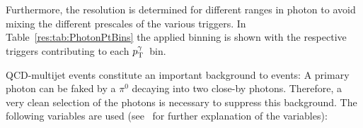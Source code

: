 Furthermore, the resolution is determined for different ranges in photon \pt to avoid mixing the different prescales of the various triggers. 
In Table~\ref{res:tab:PhotonPtBins} the applied binning is shown with the respective triggers contributing to each $p_{\text{T}}^{\gamma}$~bin.
\renewcommand{\arraystretch}{1.5}
\begin{table}[b]
\centering
\caption{Photon \pt~bins and corresponding triggers.}
\label{res:tab:PhotonPtBins}
\end{table}

QCD-multijet events constitute an important background to \GAMJET events: A primary photon can be faked by a $\pi^{0}$ decaying into two close-by photons. 
Therefore, a very clean selection of the photons is necessary to suppress this background.
The following variables are used (see~\cite{CMS-PAS-EGM-10-006} for further explanation of the variables):


